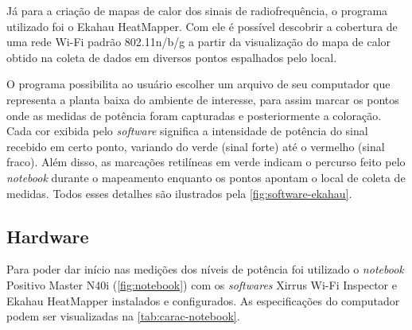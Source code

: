 Já para a criação de mapas de calor dos sinais de radiofrequência, o programa utilizado foi o Ekahau HeatMapper. Com ele é possível descobrir a cobertura de uma rede Wi-Fi padrão 802.11n/b/g a partir da visualização do mapa de calor obtido na coleta de dados em diversos pontos espalhados pelo local.

O programa possibilita ao usuário escolher um arquivo de seu computador que representa a planta baixa do ambiente de interesse, para assim marcar os pontos onde as medidas de potência foram capturadas e posteriormente a coloração. Cada cor exibida pelo \textit{software} significa a intensidade de potência do sinal recebido em certo ponto, variando do verde (sinal forte) até o vermelho (sinal fraco). Além disso, as marcações retilíneas em verde indicam o percurso feito pelo \textit{notebook} durante o mapeamento enquanto os pontos apontam o local de coleta de medidas. Todos esses detalhes são ilustrados pela \autoref{fig:software-ekahau}.

\begin{figure}[H]
	\centering
\end{figure}

\subsection{Hardware}
\label{subsec:equipamento-utilizado}

Para poder dar início nas medições dos níveis de potência foi utilizado o \textit{notebook} Positivo Master N40i (\autoref{fig:notebook}) com os \textit{softwares} Xirrus Wi-Fi Inspector e Ekahau HeatMapper instalados e configurados. As especificações do computador podem ser visualizadas na \autoref{tab:carac-notebook}.

